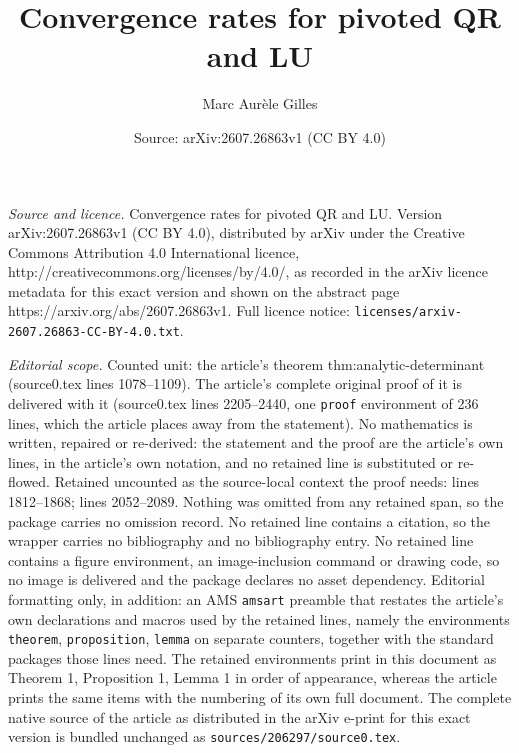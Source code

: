 \documentclass[10pt,a4paper]{amsart}
\title{Convergence rates for pivoted QR and LU}
\author{Marc Aur\`ele Gilles}
\date{Source: arXiv:2607.26863v1 (CC BY 4.0)}
\begin{document}
\maketitle

\noindent\emph{Source and licence.} Convergence rates for pivoted QR and LU. Version arXiv:2607.26863v1 (CC BY 4.0), distributed by arXiv under the Creative Commons Attribution 4.0 International licence, http://creativecommons.org/licenses/by/4.0/, as recorded in the arXiv licence metadata for this exact version and shown on the abstract page https://arxiv.org/abs/2607.26863v1. Full licence notice: \texttt{licenses/arxiv-2607.26863-CC-BY-4.0.txt}.\par\smallskip

\noindent\textit{Editorial scope.} Counted unit: the article's theorem thm:analytic-determinant (source0.tex lines 1078--1109). The article's complete original proof of it is delivered with it (source0.tex lines 2205--2440, one \texttt{proof} environment of 236 lines, which the article places away from the statement). No mathematics is written, repaired or re-derived: the statement and the proof are the article's own lines, in the article's own notation, and no retained line is substituted or re-flowed.  Retained uncounted as the source-local context the proof needs: lines 1812--1868; lines 2052--2089.  Nothing was omitted from any retained span, so the package carries no omission record.  No retained line contains a citation, so the wrapper carries no bibliography and no bibliography entry.  No retained line contains a figure environment, an image-inclusion command or drawing code, so no image is delivered and the package declares no asset dependency.  Editorial formatting only, in addition: an AMS \texttt{amsart} preamble that restates the article's own declarations and macros used by the retained lines, namely the environments \texttt{theorem}, \texttt{proposition}, \texttt{lemma} on separate counters, together with the standard packages those lines need.  The retained environments print in this document as Theorem 1, Proposition 1, Lemma 1 in order of appearance, whereas the article prints the same items with the numbering of its own full document.  The complete native source of the article as distributed in the arXiv e-print for this exact version is bundled unchanged as \texttt{sources/206297/source0.tex}.
\end{document}
